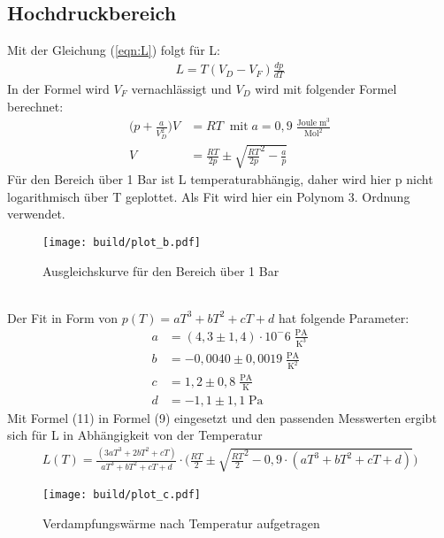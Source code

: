 \subsection{Hochdruckbereich}
Mit der Gleichung (\ref{eqn:L}) folgt für L:
\begin{align*}
    L = T(V_D - V_F) \frac{dp}{dT}
\end{align*}
In der Formel wird $V_F$ vernachlässigt und $V_D$ wird mit folgender Formel berechnet:
\begin{align*}
    \biggl( p+\frac{a}{V_D^2} \biggr) V &= RT\;\; \text{mit} \; a = 0,9 \; \frac{\text{Joule}\;{\text{m}}^3}{{\text{Mol}^2}}\\
    V &= \frac{RT}{2p} \pm \sqrt{{\frac{RT}{2p}}^2-\frac{a}{p}}
\end{align*}
Für den Bereich über 1 Bar ist L temperaturabhängig, daher wird hier p nicht logarithmisch über T geplottet.
Als Fit wird hier ein Polynom 3. Ordnung verwendet.
\begin{figure}
    \centering
    \texttt{[image: build/plot\_b.pdf]}
    \caption{Ausgleichskurve für den Bereich über 1 Bar}
    \label{fig:Hochdruck}
\end{figure}
\\Der Fit in Form von $p(T) = aT^3+bT^2+cT+d$ hat folgende Parameter:
\begin{align*}
    a &= (4,3\pm 1,4)\cdot 10^-6 \; \frac{\text{PA}}{\text{K}^3}\\
    b &= -0,0040\pm 0,0019 \; \frac{\text{PA}}{\text{K}^2}\\
    c &= 1,2\pm 0,8 \; \frac{\text{PA}}{\text{K}}\\
    d &= -1,1\pm 1,1  \; \text{Pa}
\end{align*}
Mit Formel (11) in Formel (9) eingesetzt und den passenden Messwerten ergibt sich für L in Abhängigkeit von der Temperatur
\begin{align*}
    L(T) = \frac{(3aT^3+2bT^2+cT)}{aT^3+bT^2+cT+d}\cdot \biggl( \frac{RT}{2} \pm \sqrt{\frac{RT}{2}^2 - 0,9 \cdot (aT^3+bT^2+cT+d)} \biggr)
\end{align*}
\begin{figure}
    \centering
    \texttt{[image: build/plot\_c.pdf]}
    \caption{Verdampfungswärme nach Temperatur aufgetragen}
    \label{fig:Hochdruck}
\end{figure}